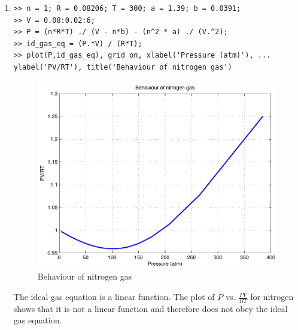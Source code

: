 \begin{enumerate}
\clearpage
\item
\begin{lstlisting}
>> n = 1; R = 0.08206; T = 300; a = 1.39; b = 0.0391;
>> V = 0.08:0.02:6;
>> P = (n*R*T) ./ (V - n*b) - (n^2 * a) ./ (V.^2);
>> id_gas_eq = (P.*V) / (R*T);
>> plot(P,id_gas_eq), grid on, xlabel('Pressure (atm)'), ...
ylabel('PV/RT'), title('Behaviour of nitrogen gas')
\end{lstlisting}
\begin{figure}[h]
	\myfloatalign
	\includegraphics[width=\linewidth]{Graphics/Additional-Ex/nitrogen-plot}
	\caption{Behaviour of nitrogen gas}
	\label{fig:nitrogen-plot}
\end{figure}
The ideal gas equation is a linear function. The plot of $P$ vs. $\frac{PV}{RT}$ for nitrogen shows that it is not a linear function and therefore does not obey the ideal gas equation.


\end{enumerate}
